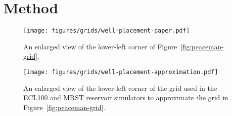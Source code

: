 
\section{Method} %
\label{sec:method}

\begin{figure}[htbp]
    \centering
    \texttt{[image: figures/grids/well-placement-paper.pdf]}
    \caption{An enlarged view of the lower-left corner of Figure~\ref{fig:peaceman-grid}.}
    \label{fig:well-placement-paper}
\end{figure}

\begin{figure}[htbp]
    \centering
    \texttt{[image: figures/grids/well-placement-approximation.pdf]}
    \caption{An enlarged view of the lower-left corner of the grid used in the ECL100 and MRST reservoir simulators to approximate the grid in Figure~\ref{fig:peaceman-grid}.}
    \label{fig:well-placement-approximation}
\end{figure}

